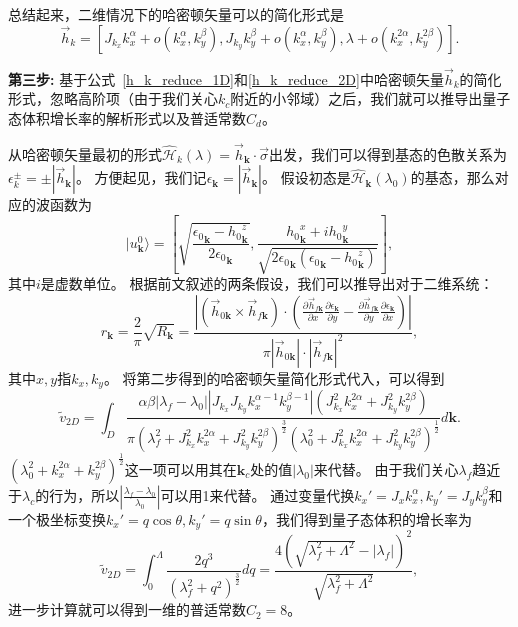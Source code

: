 			总结起来，二维情况下的哈密顿矢量可以的简化形式是
			\begin{equation} \label{h_k_reduce_2D}
				\vec{h}_k = [J_{k_x} k_x^{\alpha} + o(k_x^{\alpha} ,k_y^{\beta}), J_{k_y} k_y^{\beta} + o(k_x^{\alpha} ,k_y^{\beta}), \lambda + o(k_x^{2\alpha} ,k_y^{2\beta})].
			\end{equation}
		
			{\bf 第三步:}
			基于公式~\eqref{h_k_reduce_1D}和\eqref{h_k_reduce_2D}中哈密顿矢量$\vec{h}_k$的简化形式，忽略高阶项（由于我们关心$k_c$附近的小邻域）之后，我们就可以推导出量子态体积增长率的解析形式以及普适常数$C_d$。
			
			从哈密顿矢量最初的形式$\hat{\mathcal{H}}_k(\lambda)=\vec{h}_\mathbf{k}\cdot \vec{\sigma}$出发，我们可以得到基态的色散关系为$\epsilon_k^{\pm}=\pm|\vec{h}_\mathbf{k}|$。
			方便起见，我们记$\epsilon_\mathbf{k}=|\vec{h}_\mathbf{k}|$。
			假设初态是$\hat{\mathcal{H}}_\mathbf{k}(\lambda_0)$的基态，那么对应的波函数为
			\begin{equation}\label{phi0}
				|u_\mathbf{k}^0 \rangle=
				\left[\sqrt{\frac{{{\epsilon_0}_\mathbf{k}-{h_0}_\mathbf{k}^z}}{2{\epsilon_0}_\mathbf{k}}},
				\frac{{h_0}_\mathbf{k}^x+ i {h_0}_\mathbf{k}^y}{\sqrt{2{\epsilon_0}_\mathbf{k}({\epsilon_0}_\mathbf{k}-{h_0}_\mathbf{k}^z)}}\right],
			\end{equation}
			其中$i$是虚数单位。
			根据前文叙述的两条假设，我们可以推导出对于二维系统：
			\begin{equation} \label{Eq:rk_2D}
				r_\mathbf{k} = \frac2\pi \sqrt{R_\mathbf{k}} =\frac{\left|({\vec{h}}_{0\mathbf{k}} \times {\vec{h}}_{f\mathbf{k}}) \cdot (\frac{\partial {\vec{h}}_{f\mathbf{k}}}{\partial x} \frac{\partial \epsilon_\mathbf{k}}{\partial y} - \frac{\partial {\vec{h}}_{f\mathbf{k}}}{\partial y} \frac{\partial \epsilon_\mathbf{k}}{\partial x})\right|}{\pi|{\vec{h}}_{0\mathbf{k}}| \cdot |{\vec{h}}_{f\mathbf{k}}|^2},
			\end{equation}
			其中$x, y$指$k_x, k_y$。
			将第二步得到的哈密顿矢量简化形式代入，可以得到
			\begin{equation}
				\tilde{v}_{2D} = \int_{D}{\frac{\alpha \beta |\lambda_f-\lambda_0||J_{k_x}J_{k_y}k_x^{\alpha-1} k_y^{\beta-1}|(J_{k_x}^2k_x^{2\alpha}+J_{k_y}^2k_y^{2\beta})}{\pi(\lambda_f^2+J_{k_x}^2k_x^{2\alpha}+J_{k_y}^2k_y^{2\beta})^{\frac32}(\lambda_0^2+J_{k_x}^2k_x^{2\alpha}+J_{k_y}^2k_y^{2\beta})^{\frac12}} d\mathbf{k}}.
			\end{equation}
			$(\lambda_0^2+k_x^{2\alpha}+k_y^{2\beta})^{\frac12}$这一项可以用其在$\mathbf{k}_c$处的值$|\lambda_0|$来代替。
			由于我们关心$\lambda_f$趋近于$\lambda_c$的行为，所以$|\frac{\lambda_f-\lambda_0}{\lambda_0}|$可以用1来代替。
			通过变量代换$k_x'=J_x k_x^\alpha,k_y'=J_y k_y^\beta$和一个极坐标变换$k_x'=q\cos{\theta},k_y'=q\sin{\theta}$，我们得到量子态体积的增长率为
			\begin{equation}
				\tilde{v}_{2D} = \int_{0}^{\Lambda}{\frac{2q^3}{(\lambda_f^2+q^2)^\frac32}}dq
				= \frac{4(\sqrt{\lambda_f^2+\Lambda^2}-|\lambda_f|)^2}{\sqrt{\lambda_f^2+\Lambda^2}},
			\end{equation}
			进一步计算就可以得到一维的普适常数$C_2=8$。			
			
